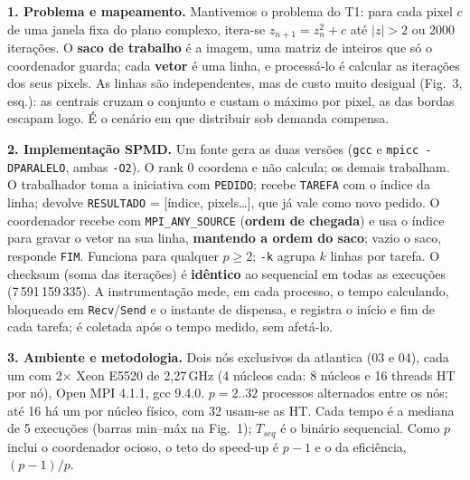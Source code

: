 \documentclass[10pt,a4paper,twocolumn]{article}
\begin{document}


\textbf{1. Problema e mapeamento.}
Mantivemos o problema do T1: para cada pixel $c$ de uma janela fixa do plano
complexo, itera-se $z_{n+1}=z_n^2+c$ até $|z|>2$ ou 2000 iterações. O
\textbf{saco de trabalho} é a imagem, uma matriz de inteiros que só o
coordenador guarda; cada \textbf{vetor} é uma linha, e processá-lo é calcular
as iterações dos seus pixels. As linhas são independentes, mas de custo muito
desigual (Fig.~3, esq.): as centrais cruzam o conjunto e custam o máximo por
pixel, as das bordas escapam logo. É o cenário em que distribuir sob demanda
compensa.

\textbf{2. Implementação SPMD.}
Um fonte gera as duas versões (\texttt{gcc} e \texttt{mpicc -DPARALELO}, ambas
\texttt{-O2}). O rank 0 coordena e não calcula; os demais trabalham. O
trabalhador toma a iniciativa com \texttt{PEDIDO}; recebe \texttt{TAREFA} com
o índice da linha; devolve \texttt{RESULTADO} = [índice, pixels\ldots], que já
vale como novo pedido. O coordenador recebe com \texttt{MPI\_ANY\_SOURCE}
(\textbf{ordem de chegada}) e usa o índice para gravar o vetor na sua linha,
\textbf{mantendo a ordem do saco}; vazio o saco, responde \texttt{FIM}.
Funciona para qualquer $p\ge2$; \texttt{-k} agrupa $k$ linhas por tarefa. O
checksum (soma das iterações) é \textbf{idêntico} ao sequencial em todas as
execuções (7\,591\,159\,335). A instrumentação mede, em cada processo, o tempo
calculando, bloqueado em \texttt{Recv}/\texttt{Send} e o instante de
dispensa, e registra o início e fim de cada tarefa; é coletada após o tempo
medido, sem afetá-lo.

\textbf{3. Ambiente e metodologia.}
Dois nós exclusivos da atlantica (03 e 04), cada um com 2$\times$ Xeon
E5520 de 2,27\,GHz (4 núcleos cada: 8 núcleos e 16 threads HT por nó),
Open MPI 4.1.1, gcc 9.4.0.
$p=2..32$ processos alternados entre os nós; até 16 há um por núcleo físico,
com 32 usam-se as HT. Cada tempo é a mediana de 5 execuções (barras min--máx
na Fig.~1); $T_{seq}$ é o binário sequencial. Como $p$ inclui o coordenador
ocioso, o teto do speed-up é $p-1$ e o da eficiência, $(p-1)/p$.
\end{document}
